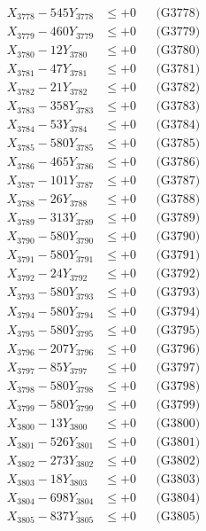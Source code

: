 \documentclass[a4paper,10pt]{article}
\begin{document}
{\begin{align}
X_{3778} - 545Y_{3778} &\leq +0 && \text{(G3778)} \\
X_{3779} - 460Y_{3779} &\leq +0 && \text{(G3779)} \\
X_{3780} - 12Y_{3780} &\leq +0 && \text{(G3780)} \\
\allowbreak
X_{3781} - 47Y_{3781} &\leq +0 && \text{(G3781)} \\
X_{3782} - 21Y_{3782} &\leq +0 && \text{(G3782)} \\
X_{3783} - 358Y_{3783} &\leq +0 && \text{(G3783)} \\
X_{3784} - 53Y_{3784} &\leq +0 && \text{(G3784)} \\
X_{3785} - 580Y_{3785} &\leq +0 && \text{(G3785)} \\
X_{3786} - 465Y_{3786} &\leq +0 && \text{(G3786)} \\
X_{3787} - 101Y_{3787} &\leq +0 && \text{(G3787)} \\
X_{3788} - 26Y_{3788} &\leq +0 && \text{(G3788)} \\
X_{3789} - 313Y_{3789} &\leq +0 && \text{(G3789)} \\
X_{3790} - 580Y_{3790} &\leq +0 && \text{(G3790)} \\
\allowbreak
X_{3791} - 580Y_{3791} &\leq +0 && \text{(G3791)} \\
X_{3792} - 24Y_{3792} &\leq +0 && \text{(G3792)} \\
X_{3793} - 580Y_{3793} &\leq +0 && \text{(G3793)} \\
X_{3794} - 580Y_{3794} &\leq +0 && \text{(G3794)} \\
X_{3795} - 580Y_{3795} &\leq +0 && \text{(G3795)} \\
X_{3796} - 207Y_{3796} &\leq +0 && \text{(G3796)} \\
X_{3797} - 85Y_{3797} &\leq +0 && \text{(G3797)} \\
X_{3798} - 580Y_{3798} &\leq +0 && \text{(G3798)} \\
X_{3799} - 580Y_{3799} &\leq +0 && \text{(G3799)} \\
X_{3800} - 13Y_{3800} &\leq +0 && \text{(G3800)} \\
\allowbreak
X_{3801} - 526Y_{3801} &\leq +0 && \text{(G3801)} \\
X_{3802} - 273Y_{3802} &\leq +0 && \text{(G3802)} \\
X_{3803} - 18Y_{3803} &\leq +0 && \text{(G3803)} \\
X_{3804} - 698Y_{3804} &\leq +0 && \text{(G3804)} \\
X_{3805} - 837Y_{3805} &\leq +0 && \text{(G3805)} \\

\end{align}}
\end{document}
